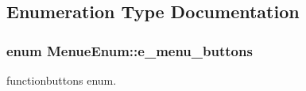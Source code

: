\subsection{Enumeration Type Documentation}
\hypertarget{namespaceMenueEnum_aa57be3de8fc6dddef5122722fb84f135}{
\subsubsection[{e\-\_\-menu\-\_\-buttons}]{\setlength{\rightskip}{0pt plus 5cm}enum {\bf Menue\-Enum\-::e\-\_\-menu\-\_\-buttons}}}\label{namespaceMenueEnum_aa57be3de8fc6dddef5122722fb84f135}


functionbuttons enum. 

